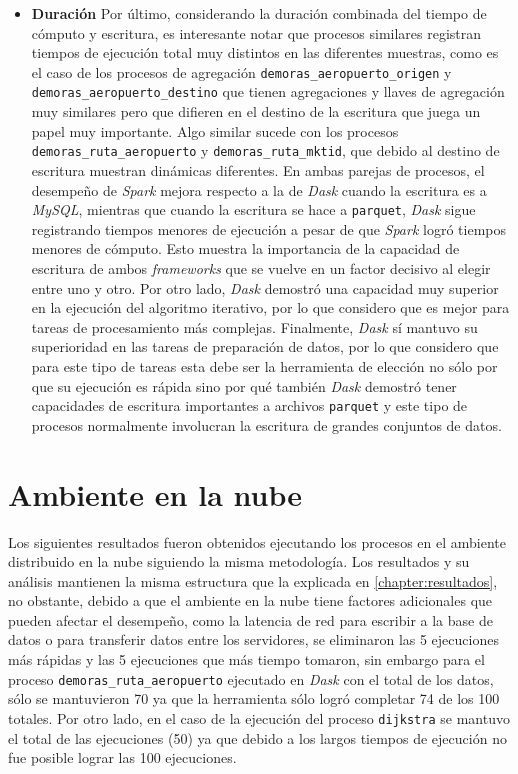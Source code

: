 \begin{itemize}
	\item \textbf{Duración} Por último, considerando la duración combinada del tiempo de cómputo y escritura, es interesante notar que procesos similares registran tiempos de ejecución total muy distintos en las diferentes muestras, como es el caso de los procesos de agregación \texttt{demoras\_aeropuerto\_origen} y \texttt{demoras\_aeropuerto\_destino} que tienen agregaciones y llaves de agregación muy similares pero que difieren en el destino de la escritura que juega un papel muy importante. Algo similar sucede con los procesos \texttt{demoras\_ruta\_aeropuerto} y \texttt{demoras\_ruta\_mktid}, que debido al destino de escritura muestran dinámicas diferentes. En ambas parejas de procesos, el desempeño de \textit{Spark} mejora respecto a la de \textit{Dask} cuando la escritura es a \textit{MySQL}, mientras que cuando la escritura se hace a \texttt{parquet}, \textit{Dask} sigue registrando tiempos menores de ejecución a pesar de que \textit{Spark} logró tiempos menores de cómputo. Esto muestra la importancia de la capacidad de escritura de ambos \textit{frameworks} que se vuelve en un factor decisivo al elegir entre uno y otro. Por otro lado, \textit{Dask} demostró una capacidad muy superior en la ejecución del algoritmo iterativo, por lo que considero que es mejor para tareas de procesamiento más complejas. Finalmente, \textit{Dask} sí mantuvo su superioridad en las tareas de preparación de datos, por lo que considero que para este tipo de tareas esta debe ser la herramienta de elección no sólo por que su ejecución es rápida sino por qué también \textit{Dask} demostró tener capacidades de escritura importantes a archivos \texttt{parquet} y este tipo de procesos normalmente involucran la escritura de grandes conjuntos de datos. 
	
\end{itemize}


\newpage

\section{Ambiente en la nube}
\label{section:resultados-ambiente-nube}

Los siguientes resultados fueron obtenidos ejecutando los procesos en el ambiente distribuido en la nube siguiendo la misma metodología. Los resultados y su análisis mantienen la misma estructura que la explicada en \ref{chapter:resultados}, no obstante, debido a que el ambiente en la nube tiene factores adicionales que pueden afectar el desempeño, como la latencia de red para escribir a la base de datos o para transferir datos entre los servidores, se eliminaron las 5 ejecuciones más rápidas y las 5 ejecuciones que más tiempo tomaron, sin embargo para el proceso \texttt{demoras\_ruta\_aeropuerto} ejecutado en \textit{Dask} con el total de los datos, sólo se mantuvieron 70 ya que la herramienta sólo logró completar 74 de los 100 totales. Por otro lado, en el caso de la ejecución del proceso \texttt{dijkstra} se mantuvo el total de las ejecuciones (50) ya que debido a los largos tiempos de ejecución no fue posible lograr las 100 ejecuciones. 

